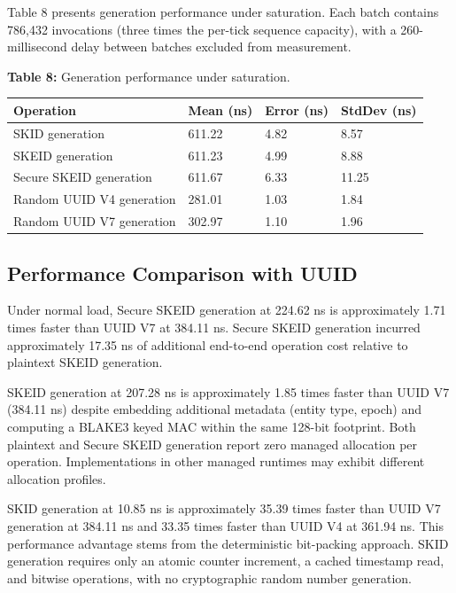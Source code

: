 \documentclass[fleqn,10pt,lineno]{wlpeerj}
\newcounter{none} %
\begin{document}
Table 8 presents generation performance under saturation. Each batch
contains 786,432 invocations (three times the per-tick sequence
capacity), with a 260-millisecond delay between batches excluded from
measurement.

\textbf{Table 8:} Generation performance under saturation.

{\def\LTcaptype{none} %
\begin{longtable}[]{@{}llll@{}}
\toprule\noalign{}
Operation & Mean (ns) & Error (ns) & StdDev (ns) \\
\midrule\noalign{}
\endhead
\bottomrule\noalign{}
\endlastfoot
SKID generation & 611.22 & 4.82 & 8.57 \\
SKEID generation & 611.23 & 4.99 & 8.88 \\
Secure SKEID generation & 611.67 & 6.33 & 11.25 \\
Random UUID V4 generation & 281.01 & 1.03 & 1.84 \\
Random UUID V7 generation & 302.97 & 1.10 & 1.96 \\
\end{longtable}
}

\subsection{Performance Comparison with
UUID}\label{performance-comparison-with-uuid}

Under normal load, Secure SKEID generation at 224.62 ns is approximately
1.71 times faster than UUID V7 at 384.11 ns. Secure SKEID generation
incurred approximately 17.35 ns of additional end-to-end operation cost
relative to plaintext SKEID generation.

SKEID generation at 207.28 ns is approximately 1.85 times faster than
UUID V7 (384.11 ns) despite embedding additional metadata (entity type,
epoch) and computing a BLAKE3 keyed MAC within the same 128-bit
footprint. Both plaintext and Secure SKEID generation report zero
managed allocation per operation. Implementations in other managed
runtimes may exhibit different allocation profiles.

SKID generation at 10.85 ns is approximately 35.39 times faster than
UUID V7 generation at 384.11 ns and 33.35 times faster than UUID V4 at
361.94 ns. This performance advantage stems from the deterministic
bit-packing approach. SKID generation requires only an atomic counter
increment, a cached timestamp read, and bitwise operations, with no
cryptographic random number generation.
\end{document}
